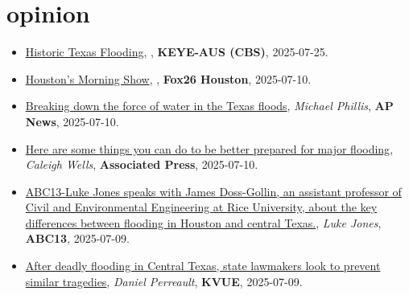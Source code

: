 \documentclass[10pt,oneside]{article}
\begin{document}
\section{opinion}

\mbox{}\vspace{-\dimexpr\baselineskip\relax}

\begin{itemize}[label={}]
  
  \item \href{https://mms.tveyes.com/Transcript.asp?StationID=2370&DateTime=7%2F25%2F2025+6%3A31%3A37+PM&LineNumber=&MediaStationID=2370&playclip=True&RefPage=&pbc=WatchlistTerm%3A1599598}{Historic Texas Flooding}, \textit{}, \textbf{KEYE-AUS (CBS)}, 2025-07-25.
        
  \item \href{https://mms.tveyes.com/Transcript.asp?StationID=979&DateTime=7%2F10%2F2025+8%3A31%3A51+AM&LineNumber=&MediaStationID=979&playclip=True&RefPage=&pbc=WatchlistTerm%3A1599598}{Houston's Morning Show}, \textit{}, \textbf{Fox26 Houston}, 2025-07-10.
        
  \item \href{https://apnews.com/article/flash-floods-texas-hill-country-hydrology-51901309407b21b65cbbc6c04206f627}{Breaking down the force of water in the Texas floods}, \textit{Michael Phillis}, \textbf{AP News}, 2025-07-10.
        
  \item \href{https://apnews.com/article/flood-hurricane-emergency-disaster-prepare-abb8f9cc9ab16c89a3937638739c6663}{Here are some things you can do to be better prepared for major flooding}, \textit{Caleigh Wells}, \textbf{Associated Press}, 2025-07-10.
        
  \item \href{https://www.facebook.com/watch/?v=1931096184096338}{ABC13-Luke Jones speaks with James Doss-Gollin, an assistant professor of Civil and Environmental Engineering at Rice University, about the key differences between flooding in Houston and central Texas.}, \textit{Luke Jones}, \textbf{ABC13}, 2025-07-09.
        
  \item \href{https://www.kvue.com/article/news/politics/special-session/central-texas-flooding-special-session/269-2e5a87d4-ec92-4fb8-b850-748de1a6cbbe}{After deadly flooding in Central Texas, state lawmakers look to prevent similar tragedies}, \textit{Daniel Perreault}, \textbf{KVUE}, 2025-07-09.
        

\end{itemize}
\end{document}
